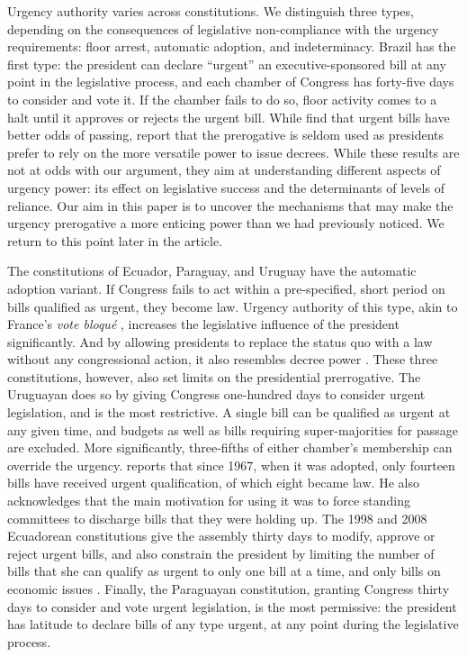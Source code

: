 \documentclass[letter,12pt]{article}
\begin{document}
Urgency authority varies across constitutions. We distinguish three types, depending on the consequences of legislative non-compliance with the urgency requirements: floor arrest, automatic adoption, and indeterminacy. Brazil has the first type: the president can declare ``urgent'' an executive-sponsored bill at any point in the legislative process, and each chamber of Congress has forty-five days to consider and vote it. If the chamber fails to do so, floor activity comes to a halt until it approves or rejects the urgent bill. While \citet{hiroi-renno-2016} find that urgent bills have better odds of passing, \citet{figueiredo.limongi.2000} report that the prerogative is seldom used as presidents prefer to rely on the more versatile power to issue decrees. While these results are not at odds with our argument, they aim at understanding different aspects of urgency power: its effect on legislative success and the determinants of levels of reliance. Our aim in this paper is to uncover the mechanisms that may make the urgency prerogative a more enticing power than we had previously noticed. We return to this point later in the article. %

The constitutions of Ecuador, Paraguay, and Uruguay have the automatic adoption variant. If Congress fails to act within a pre-specified, short period on bills qualified as urgent, they become law. Urgency authority of this type, akin to France's \emph{vote bloqué} \citep{huber.1996b}, increases the legislative influence of the president significantly. And by allowing presidents to replace the status quo with a law without any congressional action, it also resembles decree power \citep{carey.shugart.1998}. These three constitutions, however, also set limits on the presidential prerrogative. The Uruguayan does so by giving Congress one-hundred days to consider urgent legislation, and is the most restrictive. A single bill can be qualified as urgent at any given time, and budgets as well as bills requiring super-majorities for passage are excluded. More significantly, three-fifths of either chamber's membership can override the urgency. \citet{chasquetti.2016} reports that since 1967, when it was adopted, only fourteen bills have received urgent qualification, of which eight became law. He also acknowledges that the main motivation for using it was to force standing committees to discharge bills that they were holding up. The 1998 and 2008 Ecuadorean constitutions give the assembly thirty days to modify, approve or reject urgent bills, and also constrain the president by limiting the number of bills that she can qualify as urgent to only one bill at a time, and only bills on economic issues \citep{morgenstern-polga-shair.2013}. Finally, the Paraguayan constitution, granting Congress thirty days to consider and vote urgent legislation, is the most permissive: the president has latitude to declare bills of any type urgent, at any point during the legislative process.
\end{document}
